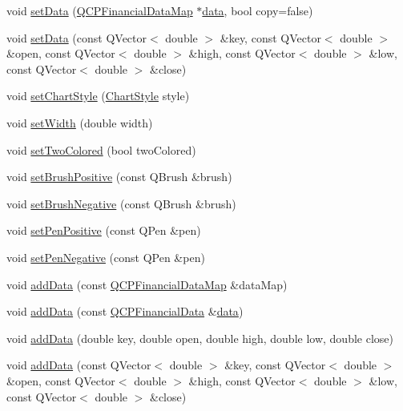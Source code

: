 \begin{DoxyCompactItemize}
\item 
void \hyperlink{classQCPFinancial_adf12a86082f1e488df6a4e8603f8fd6d}{set\+Data} (\hyperlink{qcustomplot_8h_a745c09823fae0974b50beca9bc3b3d7d}{Q\+C\+P\+Financial\+Data\+Map} $\ast$\hyperlink{classQCPFinancial_a58e05aefa057d16edfcc0334cf81c241}{data}, bool copy=false)
\item 
void \hyperlink{classQCPFinancial_a886881339d6447432af55adaad748c3c}{set\+Data} (const Q\+Vector$<$ double $>$ \&key, const Q\+Vector$<$ double $>$ \&open, const Q\+Vector$<$ double $>$ \&high, const Q\+Vector$<$ double $>$ \&low, const Q\+Vector$<$ double $>$ \&close)
\item 
void \hyperlink{classQCPFinancial_a5a59175d36279d71596e64d7bb65596f}{set\+Chart\+Style} (\hyperlink{classQCPFinancial_a0f800e21ee98d646dfc6f8f89d10ebfb}{Chart\+Style} style)
\item 
void \hyperlink{classQCPFinancial_a99633f8bac86a61d534ae5eeb1a3068f}{set\+Width} (double width)
\item 
void \hyperlink{classQCPFinancial_a138e44aac160a17a9676652e240c5f08}{set\+Two\+Colored} (bool two\+Colored)
\item 
void \hyperlink{classQCPFinancial_a5ebff2b1764efd07cc44942e67821829}{set\+Brush\+Positive} (const Q\+Brush \&brush)
\item 
void \hyperlink{classQCPFinancial_a8bbdd87629f9144b3ef51af660c0961a}{set\+Brush\+Negative} (const Q\+Brush \&brush)
\item 
void \hyperlink{classQCPFinancial_ac58aa3adc7a35aab0088764b840683e5}{set\+Pen\+Positive} (const Q\+Pen \&pen)
\item 
void \hyperlink{classQCPFinancial_afe5c07e94ccea01a75b3a2476993c346}{set\+Pen\+Negative} (const Q\+Pen \&pen)
\item 
void \hyperlink{classQCPFinancial_a1a83396f97fcc68f2b7aa8d9782feffe}{add\+Data} (const \hyperlink{qcustomplot_8h_a745c09823fae0974b50beca9bc3b3d7d}{Q\+C\+P\+Financial\+Data\+Map} \&data\+Map)
\item 
void \hyperlink{classQCPFinancial_a3b6144b48a6a8e63236fc5bf70d40c00}{add\+Data} (const \hyperlink{classQCPFinancialData}{Q\+C\+P\+Financial\+Data} \&\hyperlink{classQCPFinancial_a58e05aefa057d16edfcc0334cf81c241}{data})
\item 
void \hyperlink{classQCPFinancial_a688bbd052e00a02954ddb0068b378170}{add\+Data} (double key, double open, double high, double low, double close)
\item 
void \hyperlink{classQCPFinancial_aa1abe3bdafb297497f09cdbdc4db3958}{add\+Data} (const Q\+Vector$<$ double $>$ \&key, const Q\+Vector$<$ double $>$ \&open, const Q\+Vector$<$ double $>$ \&high, const Q\+Vector$<$ double $>$ \&low, const Q\+Vector$<$ double $>$ \&close)

\end{DoxyCompactItemize}
